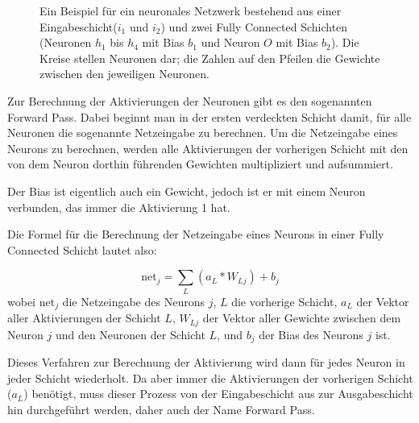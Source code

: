 \documentclass[10pt]{article}
\newcommand{\form}[1]{#1} %
\newcommand{\feng}[1]{{#1}}
\newcommand{\netin}{\textrm{net}}
\begin{document}
\begin{figure}
    
    \caption{Ein Beispiel für ein neuronales Netzwerk bestehend aus einer Eingabeschicht($i_1$ und $i_2$) und zwei Fully Connected Schichten (Neuronen $h_1$ bis $h_4$ mit Bias $b_1$ und Neuron $O$ mit Bias $b_2$). 
    Die Kreise stellen Neuronen dar; die Zahlen auf den Pfeilen die Gewichte zwischen den jeweiligen Neuronen.}
    \label{fig:dense_nn}
\end{figure}

Zur Berechnung der Aktivierungen der Neuronen gibt es den sogenannten \feng{Forward Pass}. 
Dabei beginnt man in der ersten verdeckten Schicht damit, für alle Neuronen die sogenannte Netzeingabe zu berechnen. 
Um die Netzeingabe eines Neurons zu berechnen, werden alle Aktivierungen der vorherigen Schicht mit den von dem Neuron dorthin führenden Gewichten multipliziert und aufsummiert.

Der Bias ist eigentlich auch ein Gewicht, jedoch ist er mit einem Neuron verbunden, das immer die Aktivierung 1 hat. \cite{brotcrunsher:forwardpass}

Die Formel für die Berechnung der Netzeingabe eines Neurons in einer Fully Connected Schicht lautet also:

\form{\[
	\netin_j = \sum_{L} (a_{L} * W_{Lj}) + b_{j}
	\]}
\noindent wobei $\netin_j$ die Netzeingabe des Neurons $j$, $L$ die vorherige Schicht, $a_L$ der Vektor aller Aktivierungen der Schicht $L$, $W_{Lj}$ der Vektor aller Gewichte zwischen dem Neuron $j$ und den Neuronen der Schicht $L$, und $b_j$ der Bias des Neurons $j$ ist. 


Dieses Verfahren zur Berechnung der Aktivierung wird dann für jedes Neuron in jeder Schicht wiederholt.
Da aber immer die Aktivierungen der vorherigen Schicht ($a_{L}$) benötigt, muss dieser Prozess von der Eingabeschicht aus zur Ausgabeschicht hin durchgeführt werden, daher auch der Name \feng{Forward Pass}.
\end{document}
